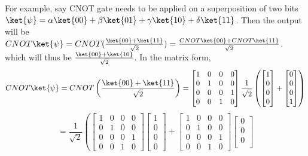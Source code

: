 \documentclass[12pt, oneside]{book}
\theoremstyle{definition}
\theoremstyle{definition}
\theoremstyle{remark}
\begin{document}
\begin{importantnote}
    For example, say CNOT gate needs to be applied on a superposition of two bits $\ket{\psi}=\alpha\ket{00}+\beta\ket{01}+\gamma\ket{10}+\delta\ket{11}$.
    Then the output will be $CNOT\ket{\psi}=CNOT(\frac{\ket{00}+\ket{11}}{\sqrt{2}})=\frac{CNOT\ket{00}+CNOT\ket{11}}{\sqrt{2}}$.
    which will thus be $\frac{\ket{00}+\ket{10}}{\sqrt{2}}$.
    In the matrix form, 
    \[
        CNOT\ket{\psi}=CNOT\left(\frac{\ket{00}+\ket{11}}{\sqrt{2}}\right)=\begin{bmatrix}
            1 & 0 & 0 & 0 \\
            0 & 1 & 0 & 0 \\
            0 & 0 & 0 & 1 \\
            0 & 0 & 1 & 0
        \end{bmatrix}\frac{1}{\sqrt{2}}\left(\begin{bmatrix}
            1 \\
            0 \\
            0 \\
            0
        \end{bmatrix}+\begin{bmatrix}
            0 \\
            0 \\
            0 \\
            1
        \end{bmatrix}\right)
    \]
    \[=\frac{1}{\sqrt{2}}\left(\begin{bmatrix}
        1 & 0 & 0 & 0 \\
        0 & 1 & 0 & 0 \\
        0 & 0 & 0 & 1 \\
        0 & 0 & 1 & 0
    \end{bmatrix}\begin{bmatrix}
        1 \\
        0 \\
        0 \\
        0
    \end{bmatrix}+\begin{bmatrix}
        1 & 0 & 0 & 0 \\
        0 & 1 & 0 & 0 \\
        0 & 0 & 0 & 1 \\
        0 & 0 & 1 & 0
    \end{bmatrix}\begin{bmatrix}
        0 \\
        0 \\
        0 \\

\end{bmatrix}\]
\end{importantnote}
\end{document}
